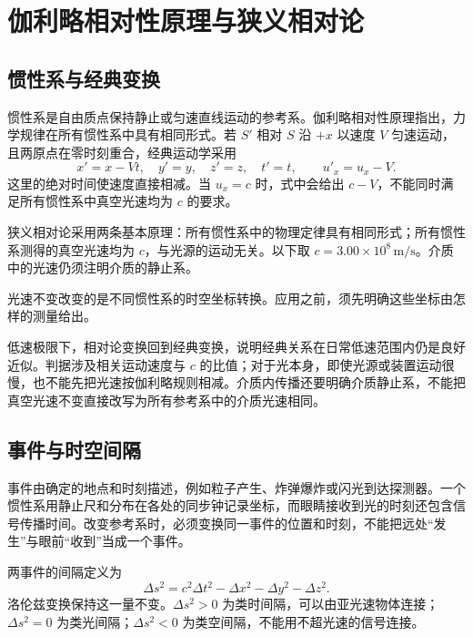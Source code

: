 \section{伽利略相对性原理与狭义相对论}

\subsection{惯性系与经典变换}

惯性系是自由质点保持静止或匀速直线运动的参考系。伽利略相对性原理指出，力学规律在所有惯性系中具有相同形式。若 $S'$ 相对 $S$ 沿 $+x$ 以速度 $V$ 匀速运动，且两原点在零时刻重合，经典运动学采用
\[
x'=x-Vt,\quad y'=y,\quad z'=z,\quad t'=t,
\qquad u'_x=u_x-V.
\]
这里的绝对时间使速度直接相减。当 $u_x=c$ 时，式中会给出 $c-V$，不能同时满足所有惯性系中真空光速均为 $c$ 的要求。

狭义相对论采用两条基本原理：所有惯性系中的物理定律具有相同形式；所有惯性系测得的真空光速均为 $c$，与光源的运动无关。以下取 $c=3.00\times10^8\,\mathrm{m/s}$。介质中的光速仍须注明介质的静止系。

光速不变改变的是不同惯性系的时空坐标转换。应用之前，须先明确这些坐标由怎样的测量给出。

低速极限下，相对论变换回到经典变换，说明经典关系在日常低速范围内仍是良好近似。判据涉及相关运动速度与 $c$ 的比值；对于光本身，即使光源或装置运动很慢，也不能先把光速按伽利略规则相减。介质内传播还要明确介质静止系，不能把真空光速不变直接改写为所有参考系中的介质光速相同。

\subsection{事件与时空间隔}

事件由确定的地点和时刻描述，例如粒子产生、炸弹爆炸或闪光到达探测器。一个惯性系用静止尺和分布在各处的同步钟记录坐标，而眼睛接收到光的时刻还包含信号传播时间。改变参考系时，必须变换同一事件的位置和时刻，不能把远处“发生”与眼前“收到”当成一个事件。

两事件的间隔定义为
\begin{equation}\label{eq:hrinterval}
\Delta s^2=c^2\Delta t^2-\Delta x^2-\Delta y^2-\Delta z^2.
\end{equation}
洛伦兹变换保持这一量不变。$\Delta s^2>0$ 为类时间隔，可以由亚光速物体连接；$\Delta s^2=0$ 为类光间隔；$\Delta s^2<0$ 为类空间隔，不能用不超光速的信号连接。

